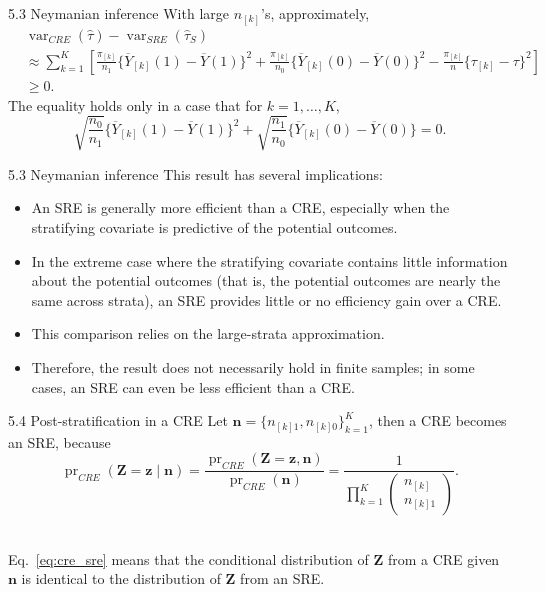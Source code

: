 \documentclass[aspectratio=169, 12pt]{beamer}
\begin{document}
\begin{frame}[label=cre_sre_diff]{5.3 Neymanian inference}
  With large $n_{[k]}$'s, approximately, 
  \begin{align}
    &\operatorname{var}_{CRE}(\widehat{\tau}) - \operatorname{var}_{SRE}(\widehat{\tau}_S) \nonumber\\
    &\approx \sum_{k=1}^{K}\left[\frac{\pi_{[k]}}{n_1}\{\overline{Y}_{[k]}(1)-\overline{Y}(1)\}^2+\frac{\pi_{[k]}}{n_0}\{\overline{Y}_{[k]}(0)-\overline{Y}(0)\}^2- \frac{\pi_{[k]}}{n}\{\tau_{[k]}-\tau\}^2\right] \nonumber\\
    &\geq 0.
    \label{eq:sre_var_diff}
  \end{align}
  The equality holds only in a case that for $k=1,\dots,K$,
  \[
  \sqrt{\frac{n_0}{n_1}}\{\overline{Y}_{[k]}(1)-\overline{Y}(1)\}^2 + \sqrt{\frac{n_1}{n_0}}\{\overline{Y}_{[k]}(0)-\overline{Y}(0)\} = 0.
  \]

  \vfill
  \hfill\hyperlink{pf-sre_var_diff<1>}{}
\end{frame}

\begin{frame}{5.3 Neymanian inference}
    This result has several implications:

  \begin{itemize}
    \item An SRE is generally more efficient than a CRE, especially when the stratifying covariate is predictive of the potential outcomes.
    \item In the extreme case where the stratifying covariate contains little information about the potential outcomes (that is, the potential outcomes are nearly the same across strata), an SRE provides little or no efficiency gain over a CRE.
    \item This comparison relies on the large-strata approximation.
    \item Therefore, the result does not necessarily hold in finite samples; in some cases, an SRE can even be less efficient than a CRE.
  \end{itemize}
\end{frame}

\begin{frame}[label=cre_sre]{5.4 Post-stratification in a CRE}
    Let $\bm{n}=\{n_{[k]1},n_{[k]0}\}_{k=1}^K$, then a CRE becomes an SRE, because 
    \begin{equation}
      \operatorname{pr}_{CRE}(\bm{Z}=\bm{z}\mid \bm{n}) = \frac{\operatorname{pr}_{CRE}(\bm{Z}=\bm{z},\bm{n})}{\operatorname{pr}_{CRE}(\bm{n})} = \frac{1}{\prod_{k=1}^{K}\begin{pmatrix}
      n_{[k]}\\n_{[k]1}
    \end{pmatrix}}.
    \label{eq:cre_sre}
    \end{equation}
    
    \vfill
    \hfill\hyperlink{pf-cre_sre<1>}{}\\

    Eq.~\eqref{eq:cre_sre} means that the conditional distribution of $\bm{Z}$ from a CRE given $\bm{n}$ is identical to the distribution of $\bm{Z}$ from an SRE.
\end{frame}
\end{document}
